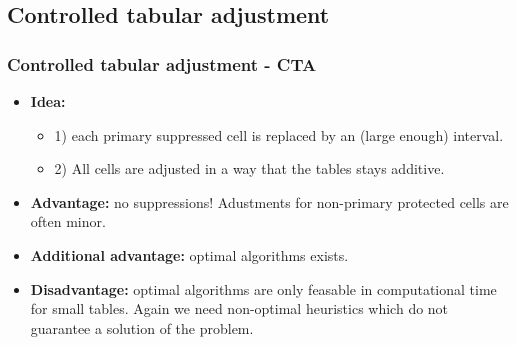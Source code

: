 \subsection{Controlled tabular adjustment}
\begin{frame}\frametitle{Controlled tabular adjustment - CTA}
	\begin{itemize}
		\item {\bf Idea:}
		\begin{itemize}
			\item 1) each primary suppressed cell is replaced by an (large enough) interval.
			\item 2) All cells are adjusted in a way that the tables stays additive. \pause
		\end{itemize}
		\item {\bf Advantage:} no suppressions! Adustments for non-primary protected cells are often minor.\pause
		\item {\bf Additional advantage:} optimal algorithms exists. \pause
		\item {\bf Disadvantage:} optimal algorithms are only feasable in computational time for small tables. Again we need non-optimal heuristics which do not guarantee a solution of the problem.
	\end{itemize}
\end{frame}

